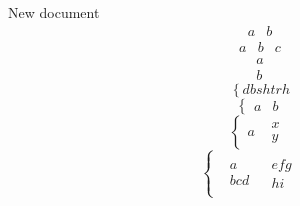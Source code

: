 \documentclass{article}
\begin{document}
New document
\begin{equation} \left.\begin{array}{ll}a&b\end{array}\right. \end{equation}
\begin{equation} \left.\begin{array}{lll}a&b&c\end{array}\right. \end{equation}
\begin{equation} \left.\begin{array}{ll}a\\b\end{array}\right. \end{equation}
\begin{equation} \left\{dbshtrh \right. \end{equation}
\begin{equation} \left\{\left.\begin{array}{ll}a&b\end{array}\right. \right. \end{equation}
\begin{equation} \left\{\left.\begin{array}{ll}a&\left.\begin{array}{ll}x\\y\end{array}\right.\end{array}\right. \right. \end{equation}
\begin{equation} \left\{\left.\begin{array}{ll}\left.\begin{array}{ll}\left.\begin{array}{ll}a\\bcd\end{array}\right.&\left.\begin{array}{ll}efg\\hi\end{array}\right.\end{array}\right.&\end{array}\right. \right. \end{equation}
\end{document}
